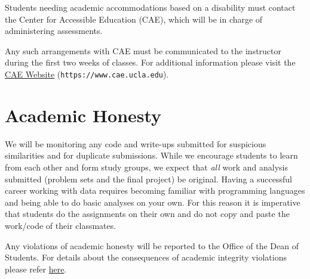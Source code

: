 \documentclass[10pt]{article}
\begin{document}
Students needing academic accommodations based on a disability must contact the Center for Accessible Education (CAE), which will be in charge of administering assessments.

Any such arrangements with CAE must be communicated to the instructor during the first two weeks of classes. For additional information please visit the \href{https://www.cae.ucla.edu/}{CAE Website} (\verb|https://www.cae.ucla.edu|).

\section*{Academic Honesty}

We will be monitoring any code and write-ups submitted for suspicious similarities and for duplicate submissions. While we encourage students to learn from each other and form study groups, we expect that \emph{all} work and analysis submitted (problem sets and the final project) be original. Having a successful career working with data requires becoming familiar with programming languages and being able to do basic analyses on your own. For this reason it is imperative that students do the assignments on their own and do not copy and paste the work/code of their classmates.  

Any violations of academic honesty will be reported to the Office of the Dean of Students. For details about the consequences of academic integrity violations please refer \href{https://www.deanofstudents.ucla.edu/Academic-Integrity/}{here}.
\end{document}
